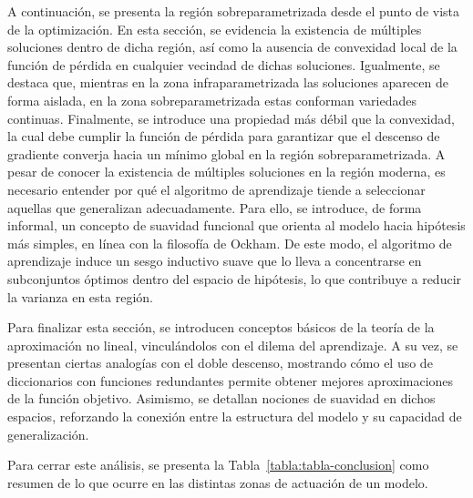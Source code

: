 A continuación, se presenta la región sobreparametrizada desde el punto de vista de la optimización. En esta sección, se evidencia la existencia de múltiples soluciones dentro de dicha región, así como la ausencia de convexidad local de la función de pérdida en cualquier vecindad de dichas soluciones. Igualmente, se destaca que, mientras en la zona infraparametrizada las soluciones aparecen de forma aislada, en la zona sobreparametrizada estas conforman variedades continuas. Finalmente, se introduce una propiedad más débil que la convexidad, la cual debe cumplir la función de pérdida para garantizar que el descenso de gradiente converja hacia un mínimo global en la región sobreparametrizada. A pesar de conocer la existencia de múltiples soluciones en la región moderna, es necesario entender por qué el algoritmo de aprendizaje tiende a seleccionar aquellas que generalizan adecuadamente. Para ello, se introduce, de forma informal, un concepto de suavidad funcional que orienta al modelo hacia hipótesis más simples, en línea con la filosofía de Ockham. De este modo, el algoritmo de aprendizaje induce un sesgo inductivo suave que lo lleva a concentrarse en subconjuntos óptimos dentro del espacio de hipótesis, lo que contribuye a reducir la varianza en esta región.\newline

Para finalizar esta sección, se introducen conceptos básicos de la teoría de la aproximación no lineal, vinculándolos con el dilema del aprendizaje. A su vez, se presentan ciertas analogías con el doble descenso, mostrando cómo el uso de diccionarios con funciones redundantes permite obtener mejores aproximaciones de la función objetivo. Asimismo, se detallan nociones de suavidad en dichos espacios, reforzando la conexión entre la estructura del modelo y su capacidad de generalización.\newline

Para cerrar este análisis, se presenta la Tabla~\ref{tabla:tabla-conclusion} como resumen de lo que ocurre en las distintas zonas de actuación de un modelo.

